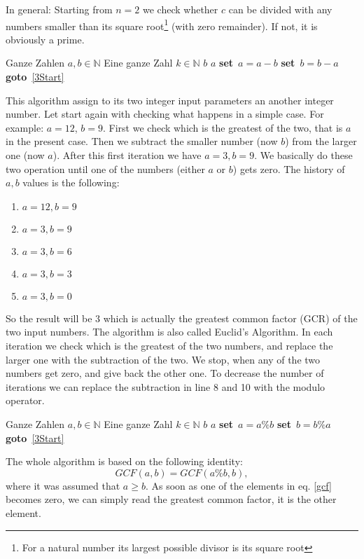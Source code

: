\documentclass{article}[12pt]
\newcommand{\SET}{\textbf{set}\ }
\newcommand{\GOTO}{\textbf{goto}\ }
\begin{document}
In general: Starting from $n=2$ we check whether $c$ can be divided with any numbers smaller than its square root\footnote{For a natural number its
largest possible divisor is its square root} (with zero remainder). If not, it is obviously a prime.

\begin{algorithm}[H]
\caption{}
\begin{algorithmic}[1]
\REQUIRE Ganze Zahlen $a,b\in\mathbb{N}$
\ENSURE Eine ganze Zahl $k\in\mathbb{N}$
\RETURN $b$
\ENDIF
{} \label{3Start}
\RETURN $a$
\ENDIF
{}
\STATE \SET $a = a - b$
\ELSE 
\STATE \SET $b = b - a$
\ENDIF
\STATE \GOTO \ref{3Start}
\end{algorithmic}
\end{algorithm} 
This algorithm assign to its two integer input parameters an another integer number. Let start again with checking what happens in 
a simple case. For example: $a=12$, $b=9$. First we check which is the greatest of the two, that is $a$ in the present case. Then we 
subtract the smaller number (now $b$) from the larger one (now $a$). After this first iteration we have $a=3,b=9$. We basically
do these two operation until one of the numbers (either $a$ or $b$) gets zero. The history of $a,b$ values is the following:
\begin{enumerate}
\item $a=12, b=9$
\item $a= 3, b=9$
\item $a= 3, b=6$
\item $a= 3, b=3$
\item $a= 3, b=0$
\end{enumerate} 
So the result will be $3$ which is actually the greatest common factor (GCR) of the two input numbers. The algorithm 
is also called Euclid's Algorithm. In each iteration we check which is the greatest of the two numbers, and replace
the larger one with the subtraction of the two. We stop, when any of the two numbers get zero, and give back the other one.
To decrease the number of iterations we can replace the subtraction in line 8 and 10 with the modulo operator.
\begin{algorithm}[H]
\caption{}
\begin{algorithmic}[1]
\REQUIRE Ganze Zahlen $a,b\in\mathbb{N}$
\ENSURE Eine ganze Zahl $k\in\mathbb{N}$
\RETURN $b$
\ENDIF
{} \label{3Start}
\RETURN $a$
\ENDIF
{}
\STATE \SET $a = a \% b$
\ELSE
\STATE \SET $b = b \% a$
\ENDIF
\STATE \GOTO \ref{3Start}
\end{algorithmic}
\end{algorithm}
The whole algorithm is based on the following identity:
\begin{equation}
\label{gcf}
GCF\left(a,b\right)=GCF\left(a\%b,b\right),
\end{equation}
where it was assumed that $a\ge b$. As soon
as one of the elements in eq. \ref{gcf} becomes zero, we 
can simply read the greatest common factor, it is the 
other element.
\end{document}
